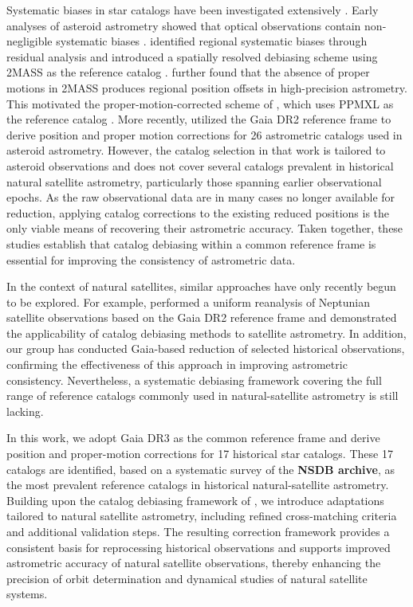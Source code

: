 \documentclass[linenumbers,amsmath,manuscript]{aastex702}
\begin{document}
Systematic biases in star catalogs have been investigated extensively \citep[e.g.,][]{Teixeira2014}. Early analyses of asteroid astrometry showed that optical observations contain non-negligible systematic biases \citep{Carpino2003}. \citet{Chesley2010} identified regional systematic biases through residual analysis and introduced a spatially resolved debiasing scheme using 2MASS as the reference catalog \citep{Skrutskie2006}. \citet{Tholen2013b} further found that the absence of proper motions in 2MASS produces regional position offsets in high-precision astrometry. This motivated the proper-motion-corrected scheme of \citet{Farnocchia2015}, which uses PPMXL as the reference catalog \citep{Roeser2010}. More recently, \citet{Eggl2020} utilized the Gaia DR2 reference frame to derive position and proper motion corrections for 26 astrometric catalogs used in asteroid astrometry. However, the catalog selection in that work is tailored to asteroid observations and does not cover several catalogs prevalent in historical natural satellite astrometry, particularly those spanning earlier observational epochs. As the raw observational data are in many cases no longer available for reduction, applying catalog corrections to the existing reduced positions is the only viable means of recovering their astrometric accuracy. Taken together, these studies establish that catalog debiasing within a common reference frame is essential for improving the consistency of astrometric data.

In the context of natural satellites, similar approaches have only recently begun to be explored. For example, \citet{Yuan2021} performed a uniform reanalysis of Neptunian satellite observations based on the Gaia DR2 reference frame and demonstrated the applicability of catalog debiasing methods to satellite astrometry. In addition, our group has conducted Gaia-based reduction of selected historical observations, confirming the effectiveness of this approach in improving astrometric consistency. Nevertheless, a systematic debiasing framework covering the full range of reference catalogs commonly used in natural-satellite astrometry is still lacking.

In this work, we adopt Gaia DR3 as the common reference frame and derive position and proper-motion corrections for 17 historical star catalogs. These 17 catalogs are identified, based on a systematic survey of the \textbf{NSDB archive}, as the most prevalent reference catalogs in historical natural-satellite astrometry. Building upon the catalog debiasing framework of \citet{Eggl2020}, we introduce adaptations tailored to natural satellite astrometry, including refined cross-matching criteria and additional validation steps. The resulting correction framework provides a consistent basis for reprocessing historical observations and supports improved astrometric accuracy of natural satellite observations, thereby enhancing the precision of orbit determination and dynamical studies of natural satellite systems.
\end{document}
